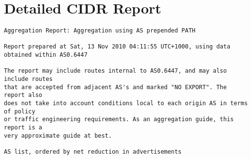 \section{Detailed CIDR Report}
\begin{lstlisting}[frame=trl]
Aggregation Report: Aggregation using AS prepended PATH

Report prepared at Sat, 13 Nov 2010 04:11:55 UTC+1000, using data obtained within AS0.6447

The report may include routes internal to AS0.6447, and may also include routes
that are accepted from adjacent AS's and marked "NO EXPORT". The report also
does not take into account conditions local to each origin AS in terms of policy
or traffic engineering requirements. As an aggregation guide, this report is a
very approximate guide at best.

AS list, ordered by net reduction in advertisements


\end{lstlisting}
